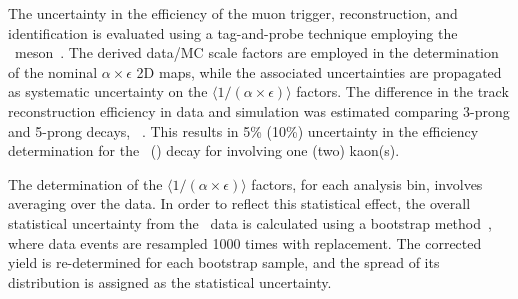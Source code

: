 \documentclass[11pt,twoside,a4paper,cmspaper]{cms-tdr}
\begin{document}
The uncertainty in the efficiency of the muon trigger, reconstruction, and identification is evaluated using a tag-and-probe technique employing the \PJGy\ meson~\cite{Khachatryan:2010zg}. The derived data/MC scale factors are employed in the determination of the nominal $\alpha\!\times\!\epsilon$ 2D maps, while the associated uncertainties are propagated as systematic uncertainty on the  $\langle 1 / (\alpha\!\times\!\epsilon)\rangle$ factors.
The difference in the track reconstruction efficiency in data and simulation was estimated comparing 3-prong and 5-prong \PDst decays, \dstardecay~\cite{Khachatryan:2016odn}. 
 This results in 5\%  (10\%) uncertainty in the efficiency determination for the \PBp\  (\PBzs) decay for involving one (two) kaon(s).

The determination of the $\langle 1 / (\alpha\!\times\!\epsilon)\rangle$ factors, for each analysis bin, involves averaging over the data. In order to reflect this statistical effect, the overall statistical uncertainty from the \PbPb\ data is calculated using a bootstrap method~\cite{bootstrap}, where data events are resampled 1000 times with replacement. The corrected yield is re-determined for each bootstrap sample, and the spread of its distribution is assigned as the statistical uncertainty.   
\end{document}

